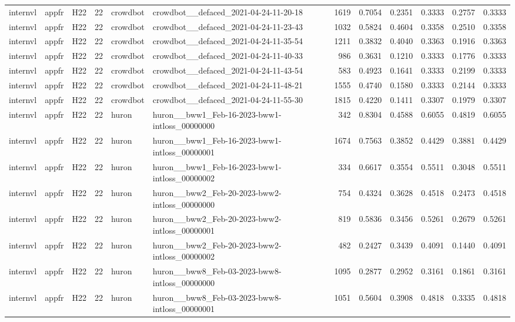 \begin{table}[tbp]
\begin{tabular}{lllrllrrrrrr}
internvl & appfr & H22 & 22 & crowdbot & crowdbot\_\_defaced\_2021-04-24-11-20-18 & 1619 & 0.7054 & 0.2351 & 0.3333 & 0.2757 & 0.3333 \\
internvl & appfr & H22 & 22 & crowdbot & crowdbot\_\_defaced\_2021-04-24-11-23-43 & 1032 & 0.5824 & 0.4604 & 0.3358 & 0.2510 & 0.3358 \\
internvl & appfr & H22 & 22 & crowdbot & crowdbot\_\_defaced\_2021-04-24-11-35-54 & 1211 & 0.3832 & 0.4040 & 0.3363 & 0.1916 & 0.3363 \\
internvl & appfr & H22 & 22 & crowdbot & crowdbot\_\_defaced\_2021-04-24-11-40-33 & 986 & 0.3631 & 0.1210 & 0.3333 & 0.1776 & 0.3333 \\
internvl & appfr & H22 & 22 & crowdbot & crowdbot\_\_defaced\_2021-04-24-11-43-54 & 583 & 0.4923 & 0.1641 & 0.3333 & 0.2199 & 0.3333 \\
internvl & appfr & H22 & 22 & crowdbot & crowdbot\_\_defaced\_2021-04-24-11-48-21 & 1555 & 0.4740 & 0.1580 & 0.3333 & 0.2144 & 0.3333 \\
internvl & appfr & H22 & 22 & crowdbot & crowdbot\_\_defaced\_2021-04-24-11-55-30 & 1815 & 0.4220 & 0.1411 & 0.3307 & 0.1979 & 0.3307 \\
internvl & appfr & H22 & 22 & huron & huron\_\_bww1\_Feb-16-2023-bww1-intloss\_00000000 & 342 & 0.8304 & 0.4588 & 0.6055 & 0.4819 & 0.6055 \\
internvl & appfr & H22 & 22 & huron & huron\_\_bww1\_Feb-16-2023-bww1-intloss\_00000001 & 1674 & 0.7563 & 0.3852 & 0.4429 & 0.3881 & 0.4429 \\
internvl & appfr & H22 & 22 & huron & huron\_\_bww1\_Feb-16-2023-bww1-intloss\_00000002 & 334 & 0.6617 & 0.3554 & 0.5511 & 0.3048 & 0.5511 \\
internvl & appfr & H22 & 22 & huron & huron\_\_bww2\_Feb-20-2023-bww2-intloss\_00000000 & 754 & 0.4324 & 0.3628 & 0.4518 & 0.2473 & 0.4518 \\
internvl & appfr & H22 & 22 & huron & huron\_\_bww2\_Feb-20-2023-bww2-intloss\_00000001 & 819 & 0.5836 & 0.3456 & 0.5261 & 0.2679 & 0.5261 \\
internvl & appfr & H22 & 22 & huron & huron\_\_bww2\_Feb-20-2023-bww2-intloss\_00000002 & 482 & 0.2427 & 0.3439 & 0.4091 & 0.1440 & 0.4091 \\
internvl & appfr & H22 & 22 & huron & huron\_\_bww8\_Feb-03-2023-bww8-intloss\_00000000 & 1095 & 0.2877 & 0.2952 & 0.3161 & 0.1861 & 0.3161 \\
internvl & appfr & H22 & 22 & huron & huron\_\_bww8\_Feb-03-2023-bww8-intloss\_00000001 & 1051 & 0.5604 & 0.3908 & 0.4818 & 0.3335 & 0.4818 \\

\end{tabular}
\end{table}
